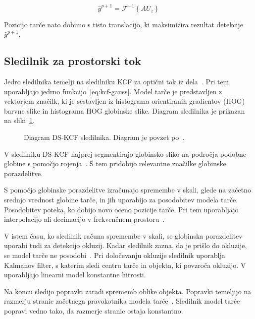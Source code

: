 \begin{equation}
\hat{y}^{p + 1} = \mathcal{F}^{-1}\left\{ A U_z \right\}
\label{eq:detection-score}
\end{equation}

Pozicijo tarče nato dobimo s tisto translacijo, ki maksimizira rezultat detekcije $\hat{y}^{p+1}$.












\subsection{Sledilnik za prostorski tok}
Jedro sledilnika temelji na sledilniku KCF za optični tok iz dela~\cite{henriques2015high}. Pri tem uporabljajo jedrno funkcijo~\eqref{eq:kcf-gauss}. Model tarče je predstavljen z vektorjem značilk, ki je sestavljen iz histograma orientiranih gradientov (HOG) barvne slike in histograma HOG globinske slike. Diagram sledilnika je prikazan na sliki~\ref{fig:diagram-dskcf}.

\begin{figure}[htb]
	\centering
	
	\caption[Diagram DS-KCF sledilnika]{Diagram DS-KCF sledilnika. Diagram je povzet po~\cite{hannuna2016ds}.}
	\label{fig:diagram-dskcf}
\end{figure}

V sledilniku DS-KCF najprej segmentirajo globinsko sliko na področja podobne globine s pomočjo rojenja~\cite{hannuna2016ds}. S tem pridobijo relevantne značilke globinske porazdelitve. 

S pomočjo globinske porazdelitve izračunajo spremembe v skali, glede na začetno srednjo vrednost globine tarče, in jih uporabijo za posodobitev modela tarče. Posodobitev poteka, ko dobijo novo oceno pozicije tarče. Pri tem uporabljajo interpolacijo ali decimacijo v frekvenčnem prostoru~\cite{hannuna2016ds}.

V istem času, ko sledilnik računa spremembe v skali, se globinska porazdelitev uporabi tudi za detekcijo okluzij. Kadar sledilnik zazna, da je prišlo do okluzije, se model tarče ne posodobi~\cite{hannuna2016ds}. Pri določevanju okluzije sledilnik uporablja Kalmanov filter, s katerim sledi centru tarče in objekta, ki povzroča okluzijo. V~\cite{hannuna2016ds} uporabljajo linearni model konstantne hitrosti.  

Na koncu sledijo popravki zaradi sprememb oblike objekta. Popravki temeljijo na razmerju stranic začetnega pravokotnika modela tarče~\cite{hannuna2016ds}. Sledilnik model tarče popravi vedno tako, da razmerje stranic ostaja konstantno.





